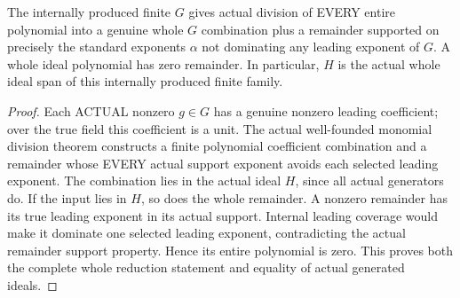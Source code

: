 \begin{theorem}
\label{hir:relative-normal-standard-actual-division}
\leanok
{}
The internally produced finite $G$ gives actual division of EVERY entire
polynomial into a genuine whole $G$ combination plus a remainder supported
on precisely the standard exponents $\alpha$ not dominating any leading
exponent of $G$. A whole ideal polynomial has zero remainder. In particular,
$H$ is the actual whole ideal span of this internally produced finite family.
\end{theorem}
\begin{proof}
Each ACTUAL nonzero $g\in G$ has a genuine nonzero leading coefficient;
over the true field this coefficient is a unit. The actual well-founded
monomial division theorem constructs a finite polynomial coefficient
combination and a remainder whose EVERY actual support exponent avoids
each selected leading exponent. The combination lies in the actual ideal
$H$, since all actual generators do. If the input lies in $H$, so does the
whole remainder. A nonzero remainder has its true leading exponent in its
actual support. Internal leading coverage would make it dominate one
selected leading exponent, contradicting the actual remainder support
property. Hence its entire polynomial is zero. This proves both the complete
whole reduction statement and equality of actual generated ideals.
\end{proof}

